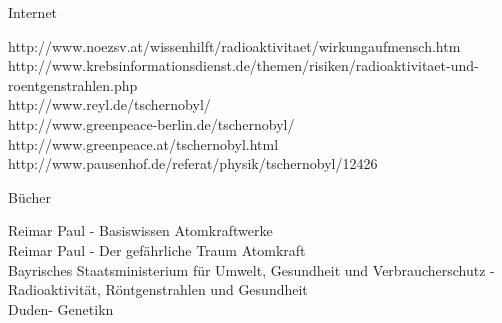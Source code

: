 \documentclass{beamer}
\begin{document}
\begin{frame}
    \begin{block}{Internet}
        \begin{tiny}
http://www.noezsv.at/wissenhilft/radioaktivitaet/wirkungaufmensch.htm\\
http://www.krebsinformationsdienst.de/themen/risiken/radioaktivitaet-und-roentgenstrahlen.php\\
http://www.reyl.de/tschernobyl/\\
http://www.greenpeace-berlin.de/tschernobyl/\\
http://www.greenpeace.at/tschernobyl.html\\
http://www.pausenhof.de/referat/physik/tschernobyl/12426\\
        \end{tiny}
    \end{block}
    \begin{block}{Bücher}
        \begin{tiny}
Reimar Paul - Basiswissen Atomkraftwerke\\
Reimar Paul - Der gefährliche Traum Atomkraft\\
Bayrisches Staatsministerium für Umwelt, Gesundheit und Verbraucherschutz - Radioaktivität, Röntgenstrahlen und Gesundheit\\
Duden- Genetikn\\
        \end{tiny}
    \end{block}
    \pause
\end{frame}
\end{document}
